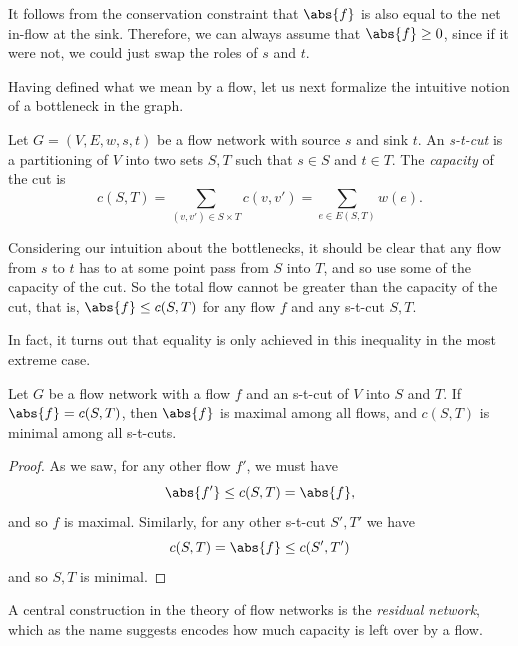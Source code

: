\documentclass[nobib]{tufte-handout}
\begin{document}
\begin{remark}
    It follows from the conservation constraint that $\abs{f}$ is also equal to the net in-flow at the sink. Therefore, we can always assume that $\abs{f} \geq 0$, since if it were not, we could just swap the roles of $s$ and $t$.
\end{remark}

Having defined what we mean by a flow, let us next formalize the intuitive notion of a bottleneck in the graph.

\begin{definition}
    Let $G = (V,E,w,s,t)$ be a flow network with source $s$ and sink $t$. An \emph{s-t-cut} is a partitioning of $V$ into two sets $S, T$ such that $s \in S$ and $t \in T$. The \emph{capacity} of the cut is
    $$c(S,T) = \sum_{(v,v') \in S \times T} c(v,v') = \sum_{e \in E(S,T)} w(e).$$
\end{definition}

Considering our intuition about the bottlenecks, it should be clear that any flow from $s$ to $t$ has to at some point pass from $S$ into $T$, and so use some of the capacity of the cut. So the total flow cannot be greater than the capacity of the cut, that is, $\abs{f} \leq c(S,T)$ for any flow $f$ and any s-t-cut $S,T$.

In fact, it turns out that equality is only achieved in this inequality in the most extreme case.

\begin{lemma}
    Let $G$ be a flow network with a flow $f$ and an s-t-cut of $V$ into $S$ and $T$. If $\abs{f} = c(S,T)$, then $\abs{f}$ is maximal among all flows, and $c(S,T)$ is minimal among all s-t-cuts.

    \begin{proof}
        As we saw, for any other flow $f'$, we must have 
        $$\abs{f'} \leq c(S,T) = \abs{f},$$
        and so $f$ is maximal. Similarly, for any other s-t-cut $S', T'$ we have
        $$c(S,T) = \abs{f} \leq c(S',T')$$
        and so $S, T$ is minimal.
    \end{proof}
\end{lemma}

A central construction in the theory of flow networks is the \emph{residual network}, which as the name suggests encodes how much capacity is left over by a flow.
\end{document}
